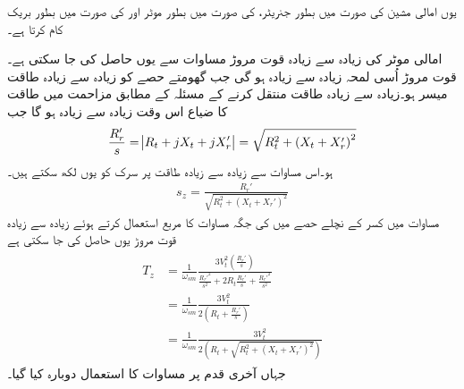 یوں امالی مشین  کی صورت میں بطور جنریٹر،  کی صورت میں بطور موٹر اور  کی صورت میں بطور بریک کام کرتا ہے۔

امالی موٹر کی زیادہ سے زیادہ قوت مروڑ مساوات   سے یوں حاصل کی جا سکتی ہے۔قوت مروڑ اُسی لمحہ زیادہ سے زیادہ ہو گی جب گھومتے حصے کو زیادہ سے زیادہ طاقت میسر ہو۔زیادہ سے زیادہ طاقت منتقل کرنے کے مسئلہ کے مطابق مزاحمت  میں طاقت کا ضیاع اس وقت زیادہ سے زیادہ ہو گا جب
\begin{align}\label{مساوات_امالی_زیادہ_طاقت_منتقلی_شرط}
\frac{R_r'}{s}=\abs{R_t+j X_t+j X_r'}=\sqrt{R_t^2+\left(X_t+X_r'\right)^2}
\end{align}
ہو۔اس مساوات سے زیادہ سے زیادہ طاقت پر سرک  کو یوں لکھ سکتے ہیں۔
\begin{align}\label{مساوات_امالی_زیادہ_طاقت_پر_سرک}
s_z=\frac{R_r'}{\sqrt{R_t^2+\left(X_t+X_r'\right)^2}}
\end{align}
مساوات   میں کسر کے نچلے حصے میں  کی جگہ  مساوات   کا مربع استعمال کرتے ہوئے زیادہ سے زیادہ قوت مروڑ  یوں حاصل کی جا سکتی ہے
\begin{gather}
\begin{aligned}
T_z&=\frac{1}{\omega_{sm}} \frac{3 V_t^2 \left(\frac{R_r'}{s} \right)}{\frac{R_r'^2}{s^2}+2 R_t \frac{R_r'}{s}+\frac{R_r'^2}{s^2}}\\
&=\frac{1}{\omega_{sm}} \frac{3 V_t^2 }{2 \left(R_t+\frac{R_r'}{s} \right)}\\
&=\frac{1}{\omega_{sm}} \frac{3 V_t^2}{2 \left(R_t+\sqrt{R_t^2+\left(X_t+X_r' \right)^2} \right)}
\end{aligned}
\end{gather}
جہاں آخری قدم پر مساوات کا استعمال دوبارہ کیا گیا۔

